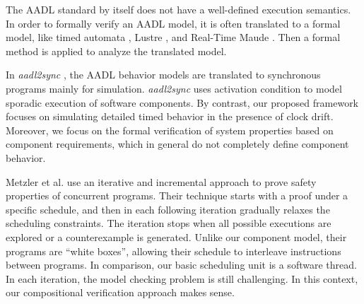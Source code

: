 The AADL standard by itself does not have a well-defined execution semantics. In order to formally verify an AADL model, it is often translated to a formal model, like timed automata \cite{behaviorAnnex}, Lustre \cite{AADL2Sync}, and Real-Time Maude \cite{maude}. Then a formal method is applied to analyze the translated model.  

In \emph{aadl2sync} \cite{AADL2Sync}, the AADL behavior models are translated to synchronous programs mainly for simulation. \emph{aadl2sync} uses activation condition to model sporadic execution of software components. By contrast, our proposed framework focuses on simulating detailed timed behavior in the presence of clock drift. Moreover, we focus on the formal verification of system properties based on component requirements, which in general do not completely define component behavior.

Metzler et al. \cite{Metzler2020} use an iterative and incremental approach to prove safety properties of concurrent programs. Their technique starts with a proof under a specific schedule, and then in each following iteration gradually relaxes the scheduling constraints. The iteration stops when all possible executions are explored or a counterexample is generated. Unlike our component model, their programs are ``white boxes'', allowing their schedule to interleave instructions between programs. In comparison, our basic scheduling unit is a software thread. In each iteration, the model checking problem is still challenging. In this context, our compositional verification approach makes sense.

